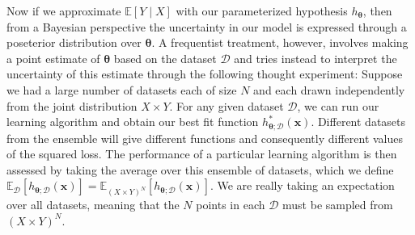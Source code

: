 \documentclass{article}
\theoremstyle{definition}
\begin{document}
    Now if we approximate $\mathbb{E}[Y \mid X]$ with our parameterized hypothesis $h_{\boldsymbol{\theta}}$, then from a Bayesian perspective the uncertainty in our model is expressed through a poseterior distribution over ${\boldsymbol{\theta}}$. A frequentist treatment, however, involves making a point estimate of ${\boldsymbol{\theta}}$ based on the dataset $\mathcal{D}$ and tries instead to interpret the uncertainty of this estimate through the following thought experiment: Suppose we had a large number of datasets each of size $N$ and each drawn independently from the joint distribution $X \times Y$. For any given dataset $\mathcal{D}$, we can run our learning algorithm and obtain our best fit function $h_{{\boldsymbol{\theta}}; \mathcal{D}}^\ast (\mathbf{x})$. Different datasets from the ensemble will give different functions and consequently different values of the squared loss. The performance of a particular learning algorithm is then assessed by taking the average over this ensemble of datasets, which we define $\mathbb{E}_\mathcal{D} [h_{{\boldsymbol{\theta}}; \mathcal{D}} (\mathbf{x})] = \mathbb{E}_{(X \times Y)^N} [h_{{\boldsymbol{\theta}}; \mathcal{D}} (\mathbf{x})]$. We are really taking an expectation over all datasets, meaning that the $N$ points in each $\mathcal{D}$ must be sampled from $(X \times Y)^N$. 
\end{document}
